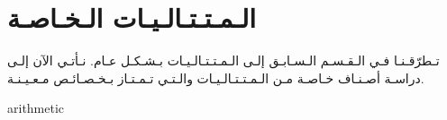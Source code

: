 \section{الـمـتـتـالـيـات الـخـاصـة}%
\label{sec:sequences:special}

تـطرّقـنـا فـي الـقـسـم الـسـابـق إلـى الـمـتـتـالـيـات بـشـكـل عـام.
نـأتـي الآن إلـى دراسـة أصـنـاف خـاصـة مـن الـمـتـتـالـيـات
والـتـي تـمـتـاز بـخـصـائـص مـعـيـنـة.

{arithmetic}